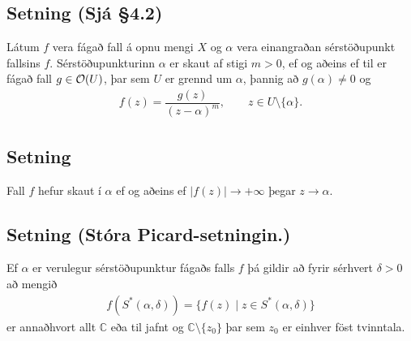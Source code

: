 \documentclass[a4paper,10pt,icelandic]{sphinxmanual}
\begin{document}
\subsection{Setning (Sjá \S{}4.2)}
\label{\detokenize{Kafli04:setning-sja-4-2}}
Látum \(f\) vera fágað fall á opnu mengi \(X\) og \(\alpha\) vera einangraðan sérstöðupunkt fallsins \(f\). Sérstöðupunkturinn \(\alpha\) er skaut af stigi \(m>0\), ef og aðeins ef til er fágað fall \(g\in {\cal O}(U)\), þar sem \(U\) er grennd um \(\alpha\), þannig að \(g(\alpha)\neq 0\) og
\begin{equation*}
\begin{split}f(z)=\dfrac{g(z)}{(z-\alpha)^ m}, \qquad z\in U\setminus\{\alpha\}.\end{split}
\end{equation*}

\subsection{Setning}
\label{\detokenize{Kafli04:setning}}
Fall \(f\) hefur skaut í \(\alpha\) ef og
aðeins ef \(|f(z)|\to +\infty\) þegar \(z\to \alpha\).


\subsection{Setning (Stóra Picard-setningin.)}
\label{\detokenize{Kafli04:setning-stora-picard-setningin}}
Ef \(\alpha\) er verulegur sérstöðupunktur fágaðs falls \(f\) þá gildir að fyrir sérhvert \(\delta>0\) að mengið
\begin{equation*}
\begin{split}f(S^*(\alpha, \delta))=\{f(z)\mid z\in S^*(\alpha, \delta)\}\end{split}
\end{equation*}
er annaðhvort allt \({\mathbb{C}}\) eða til jafnt og \({\mathbb{C}}\setminus\{z_0\}\) þar sem \(z_0\) er einhver föst tvinntala.
\end{document}
